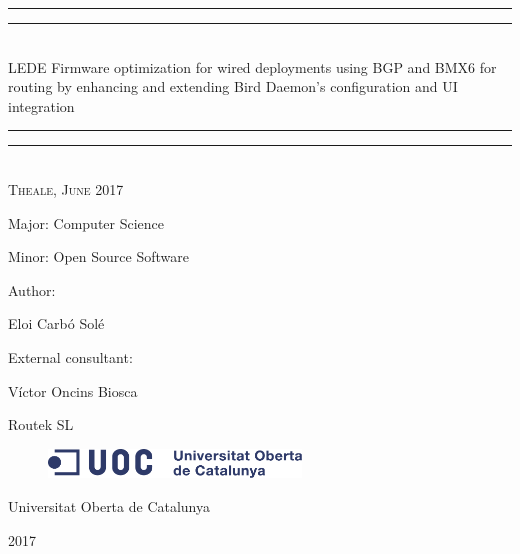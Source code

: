\begin{titlepage}
    \centering
    \vspace*{\baselineskip}
    \rule{\textwidth}{1.6pt}\vspace*{-\baselineskip}\vspace*{2pt}
    \rule{\textwidth}{0.4pt}\\[\baselineskip]
    {\LARGE LEDE Firmware optimization for wired deployments using BGP and BMX6 for routing by enhancing and extending Bird Daemon's configuration and UI integration}
    \rule{\textwidth}{0.4pt}\vspace*{-\baselineskip}\vspace{3.2pt}
    \rule{\textwidth}{1.6pt}\\[\baselineskip]
    \scshape
    Theale, June 2017\par
    \vspace*{2\baselineskip}
    Major: Computer Science\par
    Minor: Open Source Software\par
    \vspace*{2\baselineskip}
    Author: \\
    {\Large Eloi Carb\'{o} Sol\'{e}\par}
    \vspace*{1\baselineskip}
    External consultant: \\
    {\large V\'{i}ctor Oncins Biosca\par}
    Routek SL\par
    \vspace*{1\baselineskip}
    \vfill
    \begin{figure}[ht!]
        \centering
        \includegraphics[width=0.6\textwidth]{images/logo}
	\end{figure}
    {\large Universitat Oberta de Catalunya}\par
    {\scshape 2017}
\end{titlepage}

\thispagestyle{empty}
\newpage
\newpage\leavevmode


\newpage




\cleardoublepage

\pagestyle{plain}


\def\contentsname{Index}
\tableofcontents
\newpage

\listoffigures
\newpage
\lstlistoflistings

